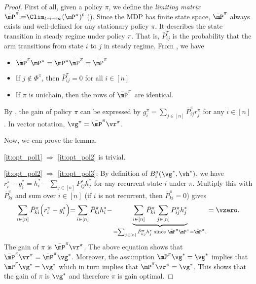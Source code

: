 \begin{proof}
    First of all, given a policy $\pi$, we define the \emph{limiting matrix} $\bar{\mP}^\pi{:=}\displaystyle\Clim_{t\to+\infty}{(\mP^\pi)^t}$ (\cite[Appendix~A.4]{puterman2014markov}). %
    Since the MDP has finite state space, $\bar{\mP}^\pi$ always exists and well-defined for any stationary policy $\pi$.
    It describes the state transition in steady regime under policy $\pi$.
    That is, $\bar{P}^\pi_{ij}$ is the probability that the arm transitions from state $i$ to $j$ in steady regime.
    From \cite[Section~A.4]{puterman2014markov}, we have
    \begin{itemize}
        \item $\bar{\mP}^\pi\mP^\pi =\mP^\pi\bar{\mP}^\pi =\bar{\mP}^\pi$
        \item If $j\notin\Phi^\pi$, then $\bar{P}^\pi_{ij}=0$ for all $i\in[n]$
        \item If $\pi$ is unichain, then the rows of $\bar{\mP}^\pi$ are identical.
    \end{itemize}
    By \cite[Theorem~8.2.6]{puterman2014markov}, the gain of policy $\pi$ can be expressed by $g^\pi_i=\sum_{j\in[n]}\bar{P}^\pi_{ij}r^{\pi}_j$ for any $i\in[n]$.
    In vector notation, $\vg^\pi=\bar{\mP}^\pi\vr^\pi$.

    Now, we can prove the lemma.

    \ref{it:opt_pol1} $\Rightarrow$ \ref{it:opt_pol2} is trivial.

    \ref{it:opt_pol2} $\Rightarrow$ \ref{it:opt_pol3}: By definition of $B_i^a(\vg^*,\vh^*)$, we have $r^{\pi}_i-g^*_i = h^*_i-\sum_{j\in[n]} P^{\pi}_{ij}h^*_j$ for any recurrent state $i$ under $\pi$.
    Multiply this with $\bar{P}^\pi_{ki}$ and sum over $i\in[n]$ (if $i$ is not recurrent, then $\bar{P}^\pi_{ki}=0$) gives
    \begin{align*}
        \sum_{i\in[n]} \bar{P}^\pi_{ki}\Big(r^{\pi}_i-g^*_i\Big) {=} \sum_{i\in[n]} \bar{P}^\pi_{ki}h^*_i {-} \underbrace{\sum_{i\in[n]} \bar{P}^\pi_{ki}\sum_{j\in[n]} P^{\pi}_{ij}h^*_j}_{=\sum_{j\in[n]} \bar{P}^\pi_{kj}h^*_j \text{ since $\bar{\mP}^\pi\mP^\pi{=}\bar{\mP}^\pi$.}}
        = \vzero.
    \end{align*}
    The gain of $\pi$ is $\bar{\mP}^\pi \vr^\pi$.
    The above equation shows that $\bar{\mP}^\pi\vr^\pi = \bar{\mP}^\pi\vg^*$. Moreover, the assumption  $\mP^\pi\vg^*=\vg^*$ implies that $\bar{\mP}^\pi\vg^*=\vg^*$ which in turn implies that $\bar{\mP}^\pi\vr^\pi=\vg^*$. This shows that the gain of $\pi$ is $\vg^*$ and therefore $\pi$ is gain optimal.


\end{proof}
